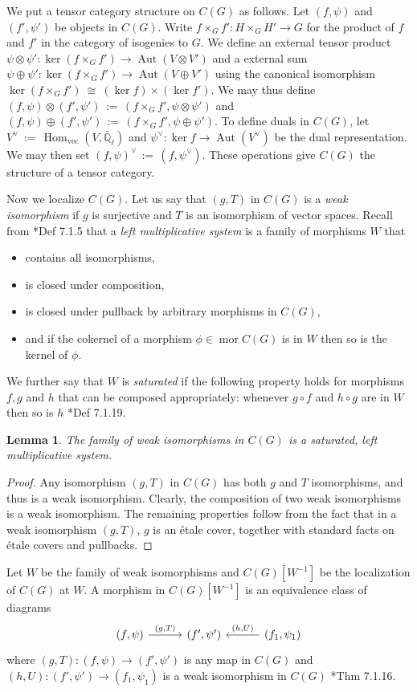 \documentclass{amsart}
\theoremstyle{plain}
\newtheorem{lemma}[theorem]{Lemma}
\theoremstyle{definition}
\theoremstyle{remark}
\newcommand{\EE}{\mathbb{\bar Q}_\ell}
\DeclareMathOperator{\Aut}{Aut}
\DeclareMathOperator{\Hom}{Hom}
\DeclareMathOperator{\mor}{mor}
\newcommand{\ceq}{{\, :=\, }}
\newcommand{\iso}{{\ \cong\ }}
\begin{document}
We put a tensor category structure on $C(G)$ as follows.
Let $(f,\psi)$ and $(f',\psi')$ be objects in $C(G)$.
Write $f\times_G f' : H\times_G H' \to G$ for the product of $f$ and $f'$
in the category of isogenies to $G$. We define an external tensor product
$\psi \otimes\psi' :  \ker(f\times_G f') \to \Aut(V\otimes V')$ and a external sum
$\psi \oplus\psi' :  \ker(f\times_G f') \to \Aut(V\oplus V')$
using the canonical isomorphism $\ker(f\times_G f') \iso (\ker f)\times (\ker f')$.
We may thus define $(f,\psi)\otimes(f',\psi') \ceq (f\times_G f' ,\psi\otimes\psi')$ and
$(f,\psi)\oplus(f',\psi')\ceq (f\times_G f' ,\psi\oplus\psi')$. To define duals in $C(G)$,
let $V^\vee \ceq \Hom_\text{vec}(V,\EE)$ and $\psi^\vee : \ker f \to \Aut(V^\vee)$ be
the dual representation.  We may then set $(f,\psi)^\vee \ceq (f,\psi^\vee)$.
These operations give $C(G)$ the structure of a tensor category.

Now we localize $C(G)$.
Let us say that $(g,T)$ in $C(G)$ is a \emph{weak isomorphism} if $g$ is surjective
and $T$ is an isomorphism of vector spaces.  Recall from
\cite{kashiwara-schapira:CatgoriesSheaves}*{Def 7.1.5} that a \emph{left multiplicative system}
is a family of morphisms $W$ that
\begin{itemize}
\item contains all isomorphisms,
\item is closed under composition,
\item is closed under pullback by arbitrary morphisms in $C(G)$,
\item and if the cokernel of a morphism $\phi \in \mor C(G)$ is in
$W$ then so is the kernel of $\phi$.
\end{itemize}

We further say that $W$ is \emph{saturated} if the following property holds for
morphisms $f, g$ and $h$ that can be composed appropriately:
whenever $g \circ f$ and $h \circ g$ are in $W$ then so is $h$
\cite{kashiwara-schapira:CatgoriesSheaves}*{Def 7.1.19}.

\begin{lemma}
The family of weak isomorphisms in $C(G)$ is a saturated, left multiplicative system.
\end{lemma}
\begin{proof}
Any isomorphism $(g, T)$ in $C(G)$ has both $g$ and $T$ isomorphisms, and thus is a weak isomorphism.
Clearly, the composition of two weak isomorphisms is a weak isomorphism.  The remaining properties
follow from the fact that in a weak isomorphism $(g, T)$, $g$ is an \'etale cover, together with standard
facts on \'etale covers and pullbacks.
\end{proof}
Let $W$ be the family of weak isomorphisms and $C(G)[W^{-1}]$ be the localization of $C(G)$ at $W$.
A morphism in $C(G)[W^{-1}]$ is an equivalence class of diagrams
\[
\begin{tikzcd}[column sep=30]
   (f,\psi) \arrow{r}{(g,T)} & (f',\psi') & \arrow[swap]{l}{(h,U)} (f_1,\psi_1)
   \end{tikzcd}
\]
 where $(g,T) : (f,\psi) \to (f',\psi')$ is any map in $C(G)$
 and $(h,U) :  (f',\psi') \to (f_1,\psi_1)$ is a weak isomorphism in $C(G)$ \cite{kashiwara-schapira:CatgoriesSheaves}*{Thm 7.1.16}.
\end{document}
